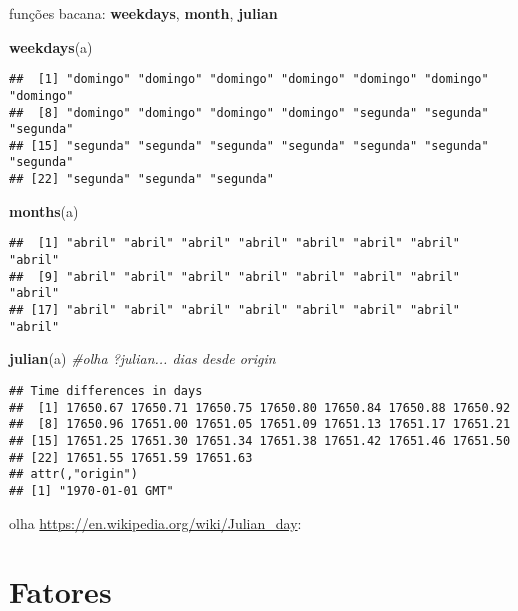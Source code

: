 \documentclass[]{book}
\newenvironment{Shaded}{\begin{snugshade}}{\end{snugshade}}
\newcommand{\KeywordTok}[1]{\textcolor[rgb]{0.13,0.29,0.53}{\textbf{#1}}}
\newcommand{\CommentTok}[1]{\textcolor[rgb]{0.56,0.35,0.01}{\textit{#1}}}
\newcommand{\NormalTok}[1]{#1}
\theoremstyle{definition}
\theoremstyle{definition}
\theoremstyle{definition}
\theoremstyle{remark}
\begin{document}
funções bacana: \textbf{weekdays}, \textbf{month}, \textbf{julian}

\begin{Shaded}
\begin{Highlighting}[]
\KeywordTok{weekdays}\NormalTok{(a)}
\end{Highlighting}
\end{Shaded}

\begin{verbatim}
##  [1] "domingo" "domingo" "domingo" "domingo" "domingo" "domingo" "domingo"
##  [8] "domingo" "domingo" "domingo" "domingo" "segunda" "segunda" "segunda"
## [15] "segunda" "segunda" "segunda" "segunda" "segunda" "segunda" "segunda"
## [22] "segunda" "segunda" "segunda"
\end{verbatim}

\begin{Shaded}
\begin{Highlighting}[]
\KeywordTok{months}\NormalTok{(a)}
\end{Highlighting}
\end{Shaded}

\begin{verbatim}
##  [1] "abril" "abril" "abril" "abril" "abril" "abril" "abril" "abril"
##  [9] "abril" "abril" "abril" "abril" "abril" "abril" "abril" "abril"
## [17] "abril" "abril" "abril" "abril" "abril" "abril" "abril" "abril"
\end{verbatim}

\begin{Shaded}
\begin{Highlighting}[]
\KeywordTok{julian}\NormalTok{(a) }\CommentTok{#olha ?julian... dias desde origin}
\end{Highlighting}
\end{Shaded}

\begin{verbatim}
## Time differences in days
##  [1] 17650.67 17650.71 17650.75 17650.80 17650.84 17650.88 17650.92
##  [8] 17650.96 17651.00 17651.05 17651.09 17651.13 17651.17 17651.21
## [15] 17651.25 17651.30 17651.34 17651.38 17651.42 17651.46 17651.50
## [22] 17651.55 17651.59 17651.63
## attr(,"origin")
## [1] "1970-01-01 GMT"
\end{verbatim}

olha \url{https://en.wikipedia.org/wiki/Julian_day}:

\section{Fatores}\label{fatores}
\end{document}
